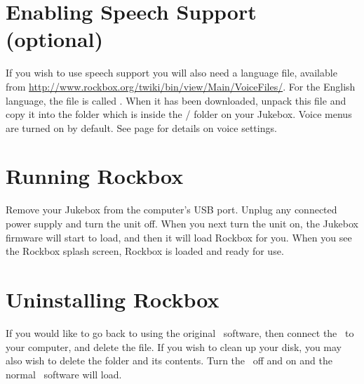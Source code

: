 \section{Enabling Speech Support (optional)}

If you wish to use speech support you will also need a language file, available from \url{http://www.rockbox.org/twiki/bin/view/Main/VoiceFiles/}.  For the English language, the file is called . When it has been downloaded, unpack this file and copy it into the  folder which is inside the / folder on your Jukebox. Voice menus are turned on by default.  See page \pageref{ref:Voiceconfiguration} for details on voice settings.


\section{Running Rockbox}

Remove your Jukebox from the computer's USB port. Unplug any connected power supply and turn the unit off. When you next turn the unit on, the Jukebox firmware will start to load, and then it will load Rockbox for you. When you see the Rockbox splash screen, Rockbox is loaded and ready for use.

\section{Uninstalling Rockbox}

If you would like to go back to using the original \playername\ software, then
connect the \playername\ to your computer, and delete the  file.
If you wish to clean up your disk, you may also wish to delete the  folder and its contents. Turn the \playername\ off and on and the normal \playername\ software will load.

